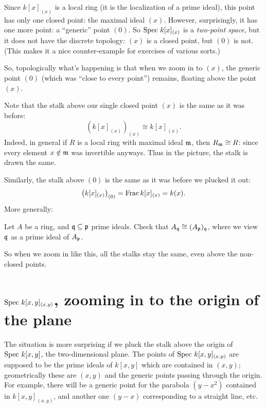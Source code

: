 Since $k[x]_{(x)}$ is a local ring
(it is the localization of a prime ideal),
this point has only one closed point: the maximal ideal $(x)$.
However, surprisingly, it has one more point:
a ``generic'' point $(0)$.
So $\text{Spec } k[x]_{(x)}$ is a \emph{two-point space},
but it does not have the discrete topology:
$(x)$ is a closed point, but $(0)$ is not.
(This makes it a nice counter-example for exercises of various sorts.)

So, topologically what's happening is that when we zoom in to $(x)$,
the generic point $(0)$ (which was ``close to every point'') remains,
floating above the point $(x)$.

Note that the stalk above our single closed point $(x)$
is the same as it was before:
\[ \left( k[x]_{(x)} \right)_{(x)} \cong k[x]_{(x)}. \]
Indeed, in general if $R$ is a local ring with maximal ideal $\mathfrak m$,
then $R_\mathfrak m \cong R$:
since every element $x \notin \mathfrak m$ was invertible anyways.
Thus in the picture, the stalk is drawn the same.

Similarly, the stalk above $(0)$ is the same as it was
before we plucked it out:
\[ \left( k[x]_{(x)} \right)_{(0)}
	= \operatorname{Frac} k[x]_{(x)} = k(x). \]
More generally:
\begin{exercise}
	Let $A$ be a ring, and $\mathfrak q \subseteq \mathfrak p$ prime ideals.
	Check that $A_\mathfrak q \cong (A_\mathfrak p)_\mathfrak q$,
	where we view $\mathfrak q$ as a prime ideal of $A_\mathfrak p$.
\end{exercise}
So when we zoom in like this, all the stalks stay the same,
even above the non-closed points.


\section{$\text{Spec } k[x,y]_{(x,y)}$, zooming in to the origin of the plane}
The situation is more surprising if we pluck the stalk
above the origin of $\text{Spec } k[x,y]$,
the two-dimensional plane.
The points of $\text{Spec } k[x,y]_{(x,y)}$ are supposed to be
the prime ideals of $k[x,y]$ which are contained in $(x,y)$;
geometrically these are $(x,y)$ and the generic points passing through the origin.
For example, there will be a generic point for the parabola $(y-x^2)$
contained in $k[x,y]_{(x,y)}$,
and another one $(y-x)$ corresponding to a straight line, etc.

